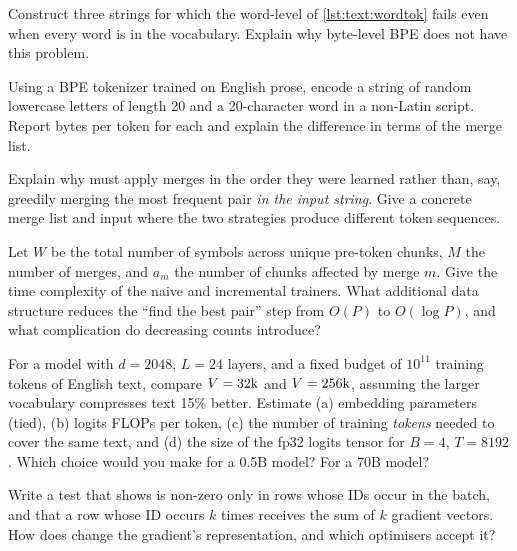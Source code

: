 \begin{exercise}
Construct three strings for which the word-level  of
\cref{lst:text:wordtok} fails  even when every word is in the
vocabulary. Explain why byte-level BPE does not have this problem.
\end{exercise}

\begin{exercise}
Using a BPE tokenizer trained on English prose, encode a string of random lowercase letters of
length 20 and a 20-character word in a non-Latin script. Report bytes per token for each and
explain the difference in terms of the merge list.
\end{exercise}

\begin{exercise}
Explain why  must apply merges in the order they were learned rather than, say,
greedily merging the most frequent pair \emph{in the input string}. Give a concrete merge list
and input where the two strategies produce different token sequences.
\end{exercise}

\begin{exercise}
Let $W$ be the total number of symbols across unique pre-token chunks, $M$ the number of merges,
and $a_m$ the number of chunks affected by merge $m$. Give the time complexity of the naive and
incremental trainers. What additional data structure reduces the ``find the best pair'' step from
$O(P)$ to $O(\log P)$, and what complication do decreasing counts introduce?
\end{exercise}

\begin{exercise}
For a model with $d=2048$, $L=24$ layers, and a fixed budget of $10^{11}$ training tokens of English
text, compare $V=32\text{k}$ and $V=256\text{k}$, assuming the larger vocabulary compresses
text 15\% better. Estimate (a) embedding parameters (tied), (b) logits FLOPs per token,
(c) the number of training \emph{tokens} needed to cover the same text, and (d) the size of the
fp32 logits tensor for $B=4$, $T=8192$. Which choice would you make for a 0.5B model? For a 70B model?
\end{exercise}

\begin{exercise}
Write a test that shows  is non-zero only in rows whose IDs occur in the batch,
and that a row whose ID occurs $k$ times receives the sum of $k$ gradient vectors. How does
 change the gradient's representation, and which optimisers
accept it?
\end{exercise}

